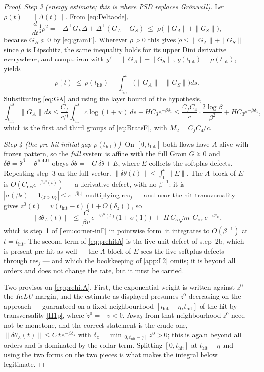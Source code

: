 \documentclass[11pt]{article}
\theoremstyle{definition}
\theoremstyle{remark}
\newcommand{\thit}{t_{\mathrm{hit}}}
\newcommand{\res}{\mathrm{res}}
\begin{document}
\begin{proof}
\emph{Step 3 (energy estimate; this is where PSD replaces Gr\"onwall).} Let
$\rho(t)=\|\Delta(t)\|$. From \eqref{eq:Deltaode},
\[
\frac{d}{dt}\tfrac12\rho^2
=-\Delta^{\!\top}G_B\Delta+\Delta^{\!\top}(G_A+G_S)
\;\le\;\rho\,\bigl(\|G_A\|+\|G_S\|\bigr),
\]
because $G_B\succeq0$ by \eqref{eq:gramF}. Wherever $\rho>0$ this gives
$\dot\rho\le\|G_A\|+\|G_S\|$; since $\rho$ is Lipschitz, the same inequality
holds for its upper Dini derivative everywhere, and comparison with
$y'=\|G_A\|+\|G_S\|$, $y(\thit)=\rho(\thit)$, yields
\begin{equation}\label{eq:psd}
\rho(t)\ \le\ \rho(\thit)+\int_{\thit}^{t}\bigl(\|G_A\|+\|G_S\|\bigr)ds .
\end{equation}
Substituting \eqref{eq:GA} and using the layer bound of the hypothesis,
\[
\int_{\thit}^{s}\|G_A\|\,ds
\le\frac{C_f}{c\beta}\int_{\thit}^{s}c\log(1+w)\,ds+HC_3e^{-\beta\delta_1}
\le\frac{C_fC_4}{c}\cdot\frac{2\log\beta}{\beta^{2}}+HC_3e^{-\beta\delta_1},
\]
which is the first and third groups of \eqref{eq:BrateF}, with $M_2=C_fC_4/c$.

\emph{Step 4 (the pre-hit initial gap $\rho(\thit)$).} On $[0,\thit]$ both flows
have $A$ alive with frozen pattern, so the \emph{full} system is affine with the
full Gram $G\succeq0$ and $\delta\theta=\theta^\beta-\theta^{\mathrm{ReLU}}$
obeys $\dot{\delta\theta}=-G\,\delta\theta+E$, where $E$ collects the softplus
defects. Repeating step~3 on the full vector,
$\|\delta\theta(t)\|\le\int_0^t\|E\|$. The $A$-block of $E$ is
$O(C_{\mathrm{res}}e^{-\beta z^0(t)})$ --- a derivative defect, with no
$\beta^{-1}$: it is $|\sigma(\beta z)-\mathbf 1_{\{z>0\}}|\le e^{-\beta|z|}$
multiplying $\res_j$ --- and near the hit transversality gives
$z^0(t)=v(\thit-t)(1+O(\delta_z))$, so
\begin{equation}\label{eq:prehitA}
\|\delta\theta_A(t)\|\ \le\ \frac{C}{\beta v}\,e^{-\beta z^0(t)}\bigl(1+o(1)\bigr)
\;+\;H\,C_5\sqrt m\,C_{\mathrm{res}}\,e^{-\beta\delta_B},
\end{equation}
which is step~1 of \cref{lem:corner-inF} in pointwise form; it integrates to
$O(\beta^{-1})$ at $t=\thit$. The second term of \eqref{eq:prehitA} is the
live-unit defect of step~2b, which is present pre-hit as well --- the $A$-block
of $E$ sees the live softplus defects through $\res_j$ --- and which the
bookkeeping of \cref{app:L2} omits; it is beyond all orders and does not change
the rate, but it must be carried.

Two provisos on \eqref{eq:prehitA}. First, the exponential weight is written
against $z^0$, the \emph{ReLU} margin, and the estimate as displayed presumes
$z^0$ decreasing on the approach --- guaranteed on a fixed neighbourhood
$[\thit-\eta,\thit]$ of the hit by transversality \eqref{H1p}, where
$\dot z^0=-v<0$. Away from that neighbourhood $z^0$ need not be monotone, and
the correct statement is the crude one,
$\|\delta\theta_A(t)\|\le C\,t\,e^{-\beta\delta_z}$ with
$\delta_z=\min_{[0,\thit-\eta]}z^0>0$; this is again beyond all orders and is
dominated by the collar term. Splitting $[0,\thit]$ at $\thit-\eta$ and using
the two forms on the two pieces is what makes the integral below legitimate.


\end{proof}
\end{document}
